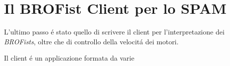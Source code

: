 \section{Il BROFist Client per lo SPAM}
L'ultimo passo \'e stato quello di scrivere il client per l'interpretazione
dei \emph{BROFists}, oltre che di controllo della velocit\'a dei motori.

Il client \'e un applicazione formata da varie 

\cleardoublepage

